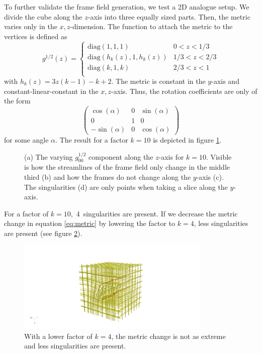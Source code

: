 \documentclass[../thesis.tex]{subfiles}
\begin{document}
To further validate the frame field generation, we test a 2D analogue setup.
We divide the cube along
the $z$-axis into three equally sized parts.
Then, the metric varies only in the $x,z$-dimension.
The function to attach the metric to the vertices is defined as
\begin{equation}
g^{1/2}(z) = \begin{cases}
    \mathrm{diag}(1,1,1) &0 < z < 1/3 \\
    \mathrm{diag}(h_k(z),1,h_k(z)) &1/3 < z < 2/3 \\
    \mathrm{diag}(k,1,k) &2/3 < z < 1 \\
\end{cases}\end{equation}\label{eq:metric}
with $h_k(z)=3z(k-1)-k+2$.
The metric is constant in the $y$-axis and constant-linear-constant in the $x,z$-axis.
Thus, the rotation coefficients are only of the form
$$\begin{pmatrix}
    \cos (\alpha) & 0 & \sin(\alpha) \\
    0 & 1 & 0 \\
    -\sin(\alpha) & 0 & \cos(\alpha)
\end{pmatrix}$$
for some angle $\alpha$.
The result for a factor $k=10$ is depicted in figure \ref{fig:image2}.
\begin{figure}[htb]
    \centering
    \def\svgwidth{\textwidth}
    
    \caption{(a) The varying $g^{1/2}_{00}$ component along the $z$-axis for $k=10$. Visible is how
    the streamlines of the frame field only change in the middle third (b) and how the frames do not change along the $y$-axis (c).
    The singularities (d) are only points when taking a slice along the $y$-axis.}
    \label{fig:image2}
\end{figure}
For a factor of $k=10$,~4~singularities are present.
If we decrease the metric change in equation \ref{eq:metric} by
lowering the factor to $k=4$, less singularities are present (see figure \ref{fig:image3}).
\begin{figure}[htb]
    \centering
    \includegraphics[width=25em]{figures/image3}
    \caption{With a lower factor of $k=4$, the metric change is not as extreme and less singularities are present.}
    \label{fig:image3}
\end{figure}
\end{document}
